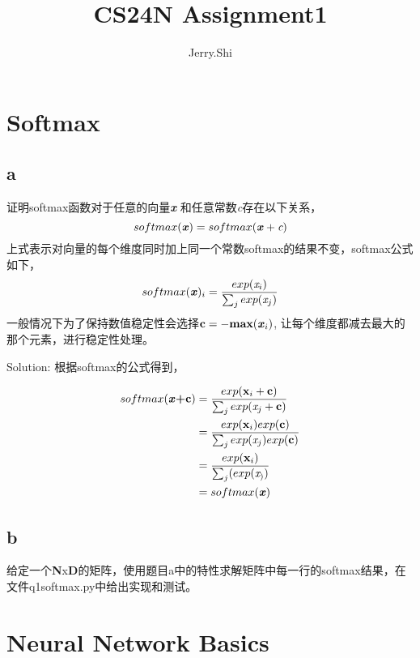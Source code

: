 \documentclass[twoside,nofonts,fancyhdr,openany,UTF8,fleqn]{ctexart} %
\title{CS24N Assignment1}    	%
\author{Jerry.Shi}		%
\begin{document}



\section{Softmax}
\subsection{a}
证明softmax函数对于任意的向量\textbf{\emph{x}} 和任意常数\emph{c}存在以下关系，
\begin{equation}
softmax(\textbf{\emph{x}}) = softmax(\textbf{\emph{x}} + \emph{c})
\end{equation}
上式表示对向量的每个维度同时加上同一个常数softmax的结果不变，softmax公式如下，
\begin{equation}
softmax(\textbf{\emph{x}})_i = \frac{exp(\emph{x}_i)}{\sum_{j}exp(\emph{x}_j)}
\end{equation}
一般情况下为了保持数值稳定性会选择$\textbf{c}=-\textbf{max}(\textbf{\emph{x}}_i)$, 让每个维度都减去最大的那个元素，进行稳定性处理。

Solution:
根据softmax的公式得到，

\begin{align}
softmax(\textbf{\emph{x}+c})  & =  \frac{exp(\textbf{x}_i + \textbf{c})}{\sum_{j}exp(\emph{x}_j+\textbf{c})} \\
								  & =  \frac{exp(\textbf{x}_i)exp(\textbf{c})}{\sum_{j}exp(\emph{x}_j)exp(\textbf{c})}	\\
								  & = \frac{exp(\textbf{x}_i)}{\sum_{j}(exp(\emph{x}_))}	\\
								  & = softmax(\textbf{\emph{x}}) 
\end{align} %

\subsection{b}
给定一个\textbf{N}x\textbf{D}的矩阵，使用题目a中的特性求解矩阵中每一行的softmax结果，在文件q1softmax.py中给出实现和测试。



\section{Neural Network Basics}
\end{document}
